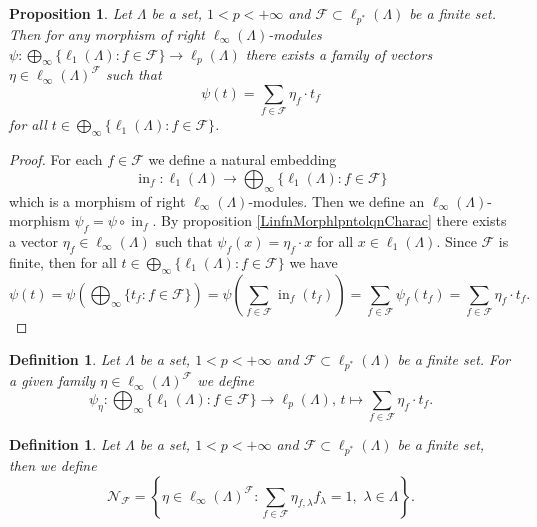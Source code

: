 \documentclass[12pt]{article}
\newtheorem{proposition}[theorem]{Proposition}
\newtheorem{definition}[theorem]{Definition}
\begin{document}
\begin{proposition}\label{ExtMorphSuml1ntlpnCharac}
    Let $\Lambda$ be a set, $1<p<+\infty$ 
    and $\mathcal{F}\subset \ell_{p^*}(\Lambda)$ be a finite set. Then for any 
    morphism of right $\ell_\infty(\Lambda)$-modules
    $\psi:\bigoplus_\infty\{\ell_1(\Lambda):f\in\mathcal{F}\}\to\ell_p(\Lambda)$ 
    there exists a family of vectors $\eta\in\ell_\infty(\Lambda)^\mathcal{F}$ 
    such that
    \[
        \psi(t)=\sum_{f\in\mathcal{F}} \eta_f \cdot t_f
    \]
    for all $t\in \bigoplus_\infty\{ \ell_1(\Lambda):f\in\mathcal{F}\}$.
\end{proposition}
\begin{proof}
    For each $f\in\mathcal{F}$  we define a natural embedding
    \[
        \operatorname{in}_f:
        \ell_1(\Lambda)\to\bigoplus_\infty\{\ell_1(\Lambda):f\in\mathcal{F}\}
    \]
    which is a morphism of right $\ell_\infty(\Lambda)$-modules. Then we define 
    an $\ell_\infty(\Lambda)$-morphism $\psi_f=\psi\circ \operatorname{in}_f$. 
    By proposition \ref{LinfnMorphlpntolqnCharac} there exists 
    a vector $\eta_f\in\ell_\infty(\Lambda)$ such that $\psi_f(x)=\eta_f\cdot x$ 
    for all $x\in\ell_1(\Lambda)$. Since $\mathcal{F}$ is finite, then for 
    all $t\in \bigoplus_\infty\{ \ell_1(\Lambda) : f\in \mathcal{F}\}$ we have
    \[
        \psi(t)
        =\psi\left(\bigoplus_\infty\{ t_f : f\in\mathcal{F}\}\right)
        =\psi\left(\sum_{f\in\mathcal{F}} \operatorname{in}_f(t_f)\right)
        =\sum_{f\in\mathcal{F}}\psi_f(t_f)
        =\sum_{f\in\mathcal{F}} \eta_f\cdot t_f.
    \]
\end{proof}

\begin{definition}\label{ParamExtMorph}
    Let $\Lambda$ be a set, $1<p<+\infty$ 
    and $\mathcal{F}\subset \ell_{p^*}(\Lambda)$ be
    a finite set. For a given family $\eta\in \ell_\infty(\Lambda)^\mathcal{F}$
    we define
    \[
        \psi_{\eta}:
        \bigoplus_\infty\{\ell_1(\Lambda):f\in\mathcal{F}\}\to\ell_p(\Lambda),\,
        t\mapsto\sum_{f\in\mathcal{F}} \eta_f\cdot t_f.
    \]
\end{definition}

\begin{definition}\label{ExtMorphs}
    Let $\Lambda$ be a set, $1<p<+\infty$ 
    and $\mathcal{F}\subset\ell_{p^*}(\Lambda)$ be a finite set, then we define
    \[
        \mathcal{N}_{\mathcal{F}}=\left\{
            \eta\in \ell_\infty(\Lambda)^{\mathcal{F}} : 
            \sum_{f\in\mathcal{F}} \eta_{f,\lambda}f_\lambda=1,\,\,
            \lambda\in\Lambda
        \right\}.
    \]
\end{definition}
\end{document}
